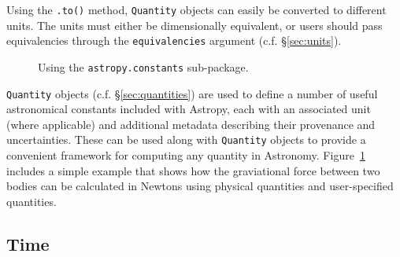 \documentclass[traditabstract]{aa}
\begin{document}
Using the \texttt{.to()} method, \texttt{Quantity} objects can easily be
converted to different units. The units must either be dimensionally
equivalent, or users should pass equivalencies through the
\texttt{equivalencies} argument (c.f. \S\ref{sec:units}).

\begin{figure}
\caption{Using the \texttt{astropy.constants} sub-package.\label{code:constants}}
\end{figure}

\texttt{Quantity} objects (c.f. \S\ref{sec:quantities}) are used to
define a number of useful astronomical constants included with
Astropy, each with an associated unit (where applicable) and
additional metadata describing their provenance and
uncertainties. These can be used along with \texttt{Quantity} objects
to provide a convenient framework for computing any quantity in
Astronomy. Figure~\ref{code:constants} includes a simple example that
shows how the graviational force between two bodies can be calculated
in Newtons using physical quantities and user-specified quantities.

\subsection{Time}

\end{document}
